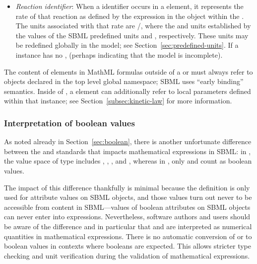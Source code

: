 \begin{itemize}
\begin{itemize}
  \item \emph{Reaction identifier}: When a \Reaction identifier
    occurs in a  element, it represents the rate of that
    reaction as defined by the  expression in
      the \KineticLaw object within the \Reaction.  The
    units associated with that rate are
      /, where the
       and  units established
    by the values of the SBML predefined units
       and , respectively.  These units
      may be redefined globally in the model; see
      Section~\ref{sec:predefined-units}.  If a \Reaction instance
      has no \KineticLaw,  (perhaps indicating that the model is
      incomplete).

  \end{itemize}

\end{itemize}

The content of  elements in MathML formulas outside of a
\KineticLaw or \FunctionDefinition must always refer to objects
declared in the top level global namespace; \ie SBML uses ``early
binding'' semantics.  Inside of \KineticLaw, a  element
can additionally refer to local parameters defined within that
\KineticLaw instance; see Section~\ref{subsec:kinetic-law} for
more information.


\subsubsection{Interpretation of boolean values}
\label{sec:handling-booleans}

As noted already in Section~\ref{sec:boolean}, there is another
unfortunate difference between the \xmlschemaone and \mathmltwo
standards that impacts mathematical expressions in SBML: in
\xmlschema, the value space of type  includes
, , , and , whereas in
\mathml, only  and  count as boolean
values.

The impact of this difference thankfully is minimal because the
\xmlschema definition is only used for attribute values on SBML
objects, and those values turn out never to be accessible from
\mathml content in SBML---values of boolean attributes on SBML objects
can never enter into \mathml expressions.  Nevertheless, software
authors and users should be aware of the difference and in
particular that  and  are interpreted as numerical
quantities in mathematical expressions.  There is no automatic
conversion of  or  to boolean values in contexts
where booleans are expected.  This allows stricter type checking
and unit verification during the validation of mathematical
expressions.


